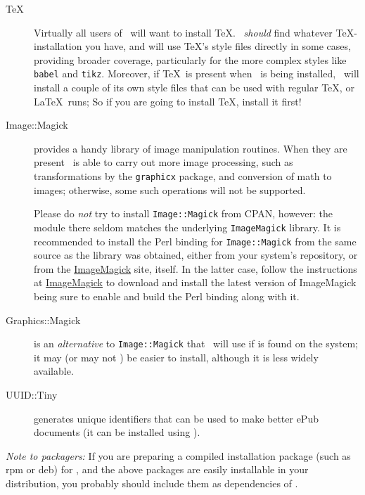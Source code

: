 \documentclass{article}
\begin{document}
\begin{description}
\item[\TeX] Virtually all users of \LaTeXML\ will want to install \TeX.  \LaTeXML\ 
\emph{should} find whatever \TeX-installation you have, and will
use \TeX's style files directly in some cases, providing broader coverage,
particularly for the more complex styles like \texttt{babel} and \texttt{tikz}.
Moreover, if \TeX\ is present when \LaTeXML\ is being installed,
\LaTeXML\ will install a couple of its own style files that can be used
with regular \TeX, or \LaTeX\ runs;
So if you are going to install \TeX, install it first!

\item[Image::Magick] provides a handy library of image manipulation routines.
When they are present \LaTeXML\ is able to carry out more image processing,
such as transformations by the \texttt{graphicx} package, and conversion of math to images;
otherwise, some such operations will not be supported.

Please do \emph{not} try to install \texttt{Image::Magick} from CPAN, however:
the module there seldom matches the underlying \texttt{ImageMagick} library.
It is recommended to install the Perl binding for \texttt{Image::Magick} from
the same source as the library was obtained, either from your system's repository,
or from the \href{http://www.imagemagick.org/}{ImageMagick} site, itself.
In the latter case, follow the instructions at \href{http://www.imagemagick.org/}{ImageMagick}
to download and install the latest version of ImageMagick being sure to enable
and build the Perl binding along with it.

\item[Graphics::Magick] is an \emph{alternative} to \texttt{Image::Magick} that \LaTeXML\ will
use if is found on the system; it may (or may not ) be easier to install, although it
is less widely available.

\item[UUID::Tiny] generates unique identifiers that can be used to make better ePub documents
  (it can be installed using \htmlref{CPAN}{install.cpan.prereq}).

\end{description}
\emph{Note to packagers:} If you are preparing a compiled installation package (such as rpm or deb) for
\LaTeXML, and the above packages are easily installable in your distribution,
you probably should include them as dependencies of \LaTeXML.


\end{document}
